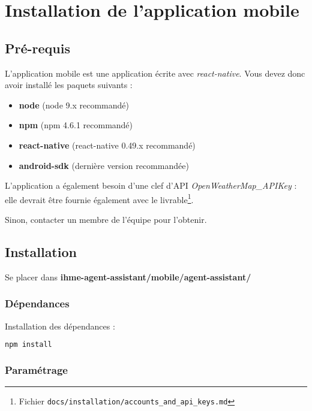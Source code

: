 \chapter{Installation de l'application mobile}

\section{Pré-requis}
L'application mobile est une application écrite avec \emph{react-native}. Vous devez donc avoir installé les paquets suivants :
\begin{itemize}
\item \textbf{node} (node 9.x recommandé)
\item \textbf{npm} (npm 4.6.1 recommandé)
\item \textbf{react-native} (react-native 0.49.x recommandé)
\item \textbf{android-sdk} (dernière version recommandée)\\
\end{itemize}


L'application a également besoin d'une clef d'API \og \emph{OpenWeatherMap\_APIKey} \fg{} : elle devrait être fournie également avec le livrable\footnote{Fichier \texttt{docs/installation/accounts\_and\_api\_keys.md}}. 

Sinon, contacter un membre de l'équipe pour l'obtenir.

\section{Installation}

Se placer dans \textbf{ihme-agent-assistant/mobile/agent-assistant/}

\subsection{Dépendances}

Installation des dépendances :
\begin{lstlisting}[language=bash]
  npm install
\end{lstlisting}

\subsection{Paramétrage}

